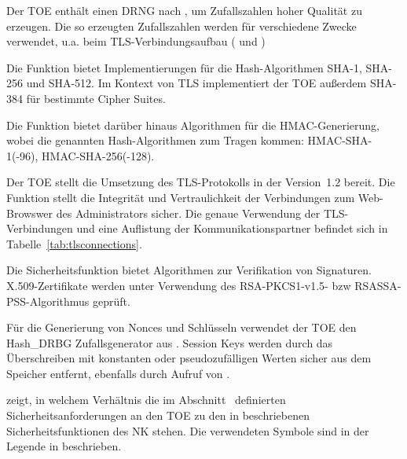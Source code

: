 
Der TOE enthält einen DRNG nach , um Zufallszahlen
hoher Qualität zu erzeugen. Die so erzeugten Zufallszahlen werden für
verschiedene Zwecke verwendet, u.a. beim TLS-Verbindungsaufbau
( und )



Die Funktion bietet Implementierungen für die Hash-Algorithmen SHA-1,
SHA-256 und SHA-512. Im Kontext von TLS implementiert der TOE außerdem
SHA-384 für bestimmte Cipher Suites.



Die Funktion bietet darüber hinaus Algorithmen für die HMAC-Generierung, wobei
die genannten Hash-Algorithmen zum Tragen kommen: HMAC-SHA-1(-96),
HMAC-SHA-256(-128).



Der TOE stellt die Umsetzung des TLS-Protokolls in der Version~1.2 bereit. Die
Funktion stellt die Integrität und Vertraulichkeit der Verbindungen zum
Web-Browswer des Administrators sicher. Die genaue Verwendung der
TLS-Verbindungen und eine Auflistung der Kommunikationspartner befindet sich in
Tabelle~\vref{tab:tlsconnections}.


Die Sicherheitsfunktion  bietet Algorithmen
zur Verifikation von Signaturen. X.509-Zertifikate werden unter Verwendung des
RSA-PKCS1-v1.5- bzw RSASSA-PSS-Algorithmus geprüft.


Für die Generierung von Nonces und Schlüsseln verwendet der TOE den Hash\_DRBG
Zufallsgenerator aus . Session Keys werden
durch das Überschreiben mit konstanten oder pseudozufälligen Werten sicher aus
dem Speicher entfernt, ebenfalls durch Aufruf von
.


\pagebreak


 zeigt, in welchem Verhältnis die im
Abschnitt~ definierten Sicherheitsanforderungen an den
TOE zu den in  beschriebenen Sicherheitsfunktionen des NK
stehen. Die verwendeten Symbole sind in der Legende in
 beschrieben.





